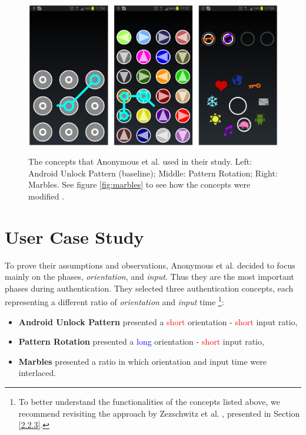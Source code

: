 \begin{figure}[t!]
\centering
\includegraphics[width=14cm, height=7cm]{Chapters/graphics/androidPatternMarble.PNG}
\caption{The concepts that Anonymous et al. \cite{anonymous} used in their study. Left: Android Unlock Pattern (baseline); Middle: Pattern Rotation; Right: Marbles. See figure \ref{fig:marbles} to see how the concepts were modified \cite{anonymous}.}
\label{fig:android}
\end{figure}

\section{User Case Study}

To prove their assumptions and observations, Anonymous et al. \cite{anonymous} decided to focus mainly on the phases, \textit{orientation}, and \textit{input}. Thus they are the most important phases during authentication. They selected three authentication concepts, each representing a different ratio of \textit{orientation} and \textit{input} time \cite{anonymous}
\footnote{To better understand the functionalities of the concepts listed above, we recommend revisiting the approach by Zezschwitz et al. \cite{Marbles}, presented in Section \ref{2.2.3}.}: 

\begin{itemize}
    \item \textbf{Android Unlock Pattern} presented a \textcolor{red}{short} orientation - \textcolor{red}{short} input ratio,
    \item \textbf{Pattern Rotation} presented a \textcolor{blue}{long} orientation - \textcolor{red}{short} input ratio,
    \item \textbf{Marbles} presented a ratio in which orientation and input time were interlaced.
\end{itemize}

